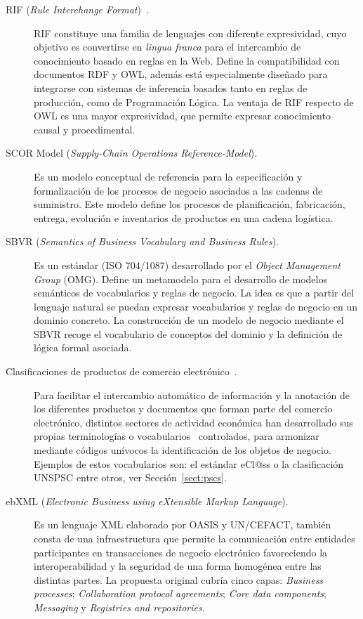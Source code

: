\begin{description}
\item[\gls{RIF} (\textit{Rule Interchange Format})~\cite{rif-core}.] RIF constituye una familia de lenguajes con diferente expresividad, 
cuyo objetivo es convertirse en \textit{lingua franca} para el intercambio de
conocimiento basado en reglas en la Web. Define la compatibilidad con
documentos RDF y OWL, además está especialmente diseñado para integrarse con
sistemas de inferencia basados tanto en reglas de producción, como de
Programación Lógica. La ventaja de RIF respecto de OWL es una mayor expresividad, 
que permite expresar conocimiento causal y procedimental. 


\item [\gls{SCOR} Model (\textit{Supply-Chain Operations Reference-Model}).] Es un modelo conceptual de
referencia para la especificación y formalización de los procesos de negocio
asociados a las cadenas de suministro. Este modelo define los procesos de
planificación, fabricación, entrega, evolución e inventarios de productos en una
cadena logística.

\item [\gls{SBVR} (\textit{Semantics of Business Vocabulary and Business Rules}).] Es un estándar
(ISO 704/1087) desarrollado por el \textit{Object Management Group} (\gls{OMG}). Define un
metamodelo para el desarrollo de modelos semánticos de vocabularios y reglas de
negocio. La idea es que a partir del lenguaje natural se puedan expresar
vocabularios y reglas de negocio en un dominio concreto. La construcción de un
modelo de negocio mediante el SBVR recoge el vocabulario de conceptos del
dominio y la definición de lógica formal asociada.

\item [Clasificaciones de productos de comercio electrónico~\cite{Leukel-ecatalog2005,Leukel-standard,Leukel-automating}.] Para
facilitar el intercambio automático de información y la anotación de los diferentes productos
y documentos que forman parte del comercio electrónico, distintos sectores de
actividad económica han desarrollado sus propias terminologías o
vocabularios~\cite{Norbert-class} controlados, para armonizar mediante códigos unívocos la identificación de
los objetos de negocio. Ejemplos de estos vocabularios son: el estándar eCl@ss o
la clasificación \gls{UNSPSC} entre otros, ver Sección~\ref{sect:pscs}.


\item [\gls{ebXML} (\textit{Electronic Business using eXtensible Markup Language}).] Es un lenguaje
\gls{XML} elaborado por \gls{OASIS} y UN/CEFACT, también consta de una infraestructura que permite la comunicación entre entidades
participantes en transacciones de negocio electrónico favoreciendo la interoperabilidad y la seguridad de una forma homogénea entre las distintas partes.
La propuesta original cubría cinco capas: \textit{Business processes}; \textit{Collaboration protocol agreements};
\textit{Core data components}; \textit{Messaging} y \textit{Registries and repositories}.


\end{description}

